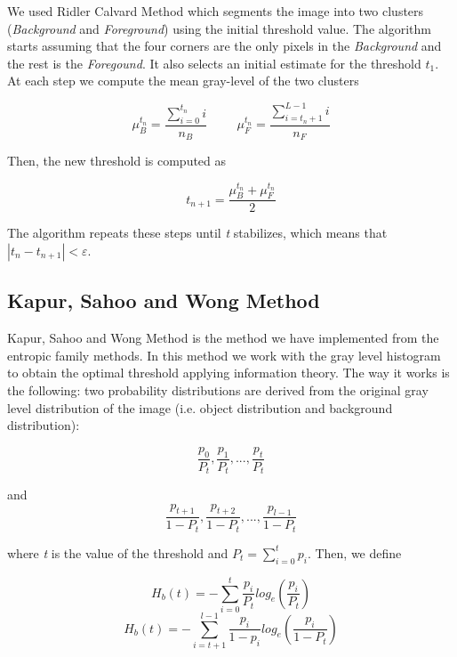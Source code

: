 \documentclass[12]{article}
\begin{document}
We used Ridler Calvard Method which segments the image into two clusters (\textit{Background} and \textit{Foreground}) using the initial threshold value. The algorithm starts assuming that the four corners are the only pixels in the \textit{Background} and the rest is the \textit{Foregound}. It also selects an initial estimate for the threshold \textit{$t_1$}. At each step we compute the mean gray-level of the two clusters
\vspace{-0.5cm}
\begin{center}
$$ \mu_{B}^{t_n} = \frac{\sum_{i = 0}^{t_n} i}{n_B} \hspace{1cm} \mu_{F}^{t_n} = \frac{\sum_{i = t_n + 1}^{L - 1} i}{n_F} $$
\end{center}
Then, the new threshold is computed as
\vspace{-0.5cm}
\begin{center}
$$ t_{n + 1} = \frac{\mu_{B}^{t_n} + \mu_{F}^{t_n}}{2} $$
\end{center}
The algorithm repeats these steps until \textit{t} stabilizes, which means that $|t_n - t_{n + 1}| < \varepsilon $.

\subsection{Kapur, Sahoo and Wong Method}
Kapur, Sahoo and Wong Method is the method we have implemented from the entropic family methods. In this method we work with the gray level histogram to obtain the optimal threshold applying information theory.
The way it works is the following: two probability distributions are derived from the original gray level distribution of the image (i.e. object distribution and background distribution): 
\vspace{-0.5cm}
\begin{center}
$$\frac{p_0}{P_t},\frac{p_1}{P_t},...,\frac{p_t}{P_t}$$
\end{center} \begin{center}
and
$$\frac{p_{t+1}}{1-P_t},\frac{p_{t+2}}{1-P_t},...,\frac{p_{l-1}}{1-P_t}$$
\end{center}
\vspace{0.4cm}

where \textit{t} is the value of the threshold and $P_t = \sum_{i=0}^{t}{p_i}$. Then, we define

$$H_b(t) = - \sum_{i = 0}^{t} \frac{p_i}{P_t}log_e\left(\frac{p_i}{P_t}\right)$$
$$ H_b(t) = - \sum_{i = t+1}^{l-1} \frac{p_i}{1-p_i}log_e\left(\frac{p_i}{1-P_t}\right)$$
\end{document}
